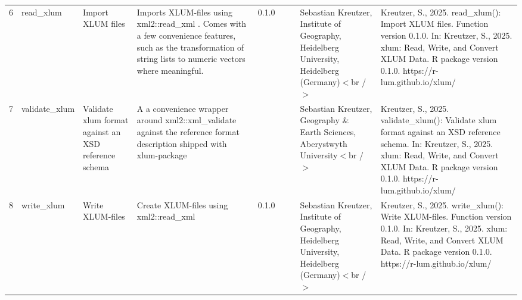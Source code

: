 \begin{table}[ht]
\begin{tabular}{rllllllll}
 \\ 
  6 & read\_xlum & Import XLUM files & Imports XLUM-files using  xml2::read\_xml . Comes with a few convenience features, such as the transformation of string lists to numeric vectors where meaningful. & 0.1.0
 &  &  & Sebastian Kreutzer, Institute of Geography, Heidelberg University, Heidelberg (Germany)$<$br /$>$ & Kreutzer, S., 2025. read\_xlum(): Import XLUM files. Function version 0.1.0. In: Kreutzer, S., 2025. xlum: Read, Write, and Convert XLUM Data. R package version 0.1.0. https://r-lum.github.io/xlum/
 \\ 
  7 & validate\_xlum & Validate xlum format against an XSD reference schema & A a convenience wrapper around  xml2::xml\_validate  against the reference format description shipped with  xlum-package &  &  &  & Sebastian Kreutzer, Geography \& Earth Sciences, Aberystwyth University$<$br /$>$ & Kreutzer, S., 2025. validate\_xlum(): Validate xlum format against an XSD reference schema. In: Kreutzer, S., 2025. xlum: Read, Write, and Convert XLUM Data. R package version 0.1.0. https://r-lum.github.io/xlum/
 \\ 
  8 & write\_xlum & Write XLUM-files & Create XLUM-files using  xml2::read\_xml & 0.1.0
 &  &  & Sebastian Kreutzer, Institute of Geography, Heidelberg University, Heidelberg (Germany)$<$br /$>$ & Kreutzer, S., 2025. write\_xlum(): Write XLUM-files. Function version 0.1.0. In: Kreutzer, S., 2025. xlum: Read, Write, and Convert XLUM Data. R package version 0.1.0. https://r-lum.github.io/xlum/
 \\ 
   \hline
\end{tabular}
\end{table}

